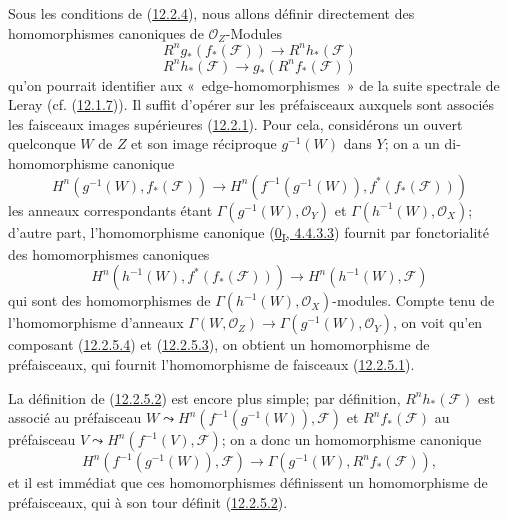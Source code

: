 \begin{env}[12.2.5]
\label{0.12.2.5-fr}
Sous les conditions de (\hyperref[0.12.2.4-fr]{12.2.4}), nous allons définir
directement des homomorphismes canoniques de $\mathcal O_Z$-Modules
\[
\label{0.12.2.5.1-fr}
\tag{12.2.5.1}
R^n g_*(f_*(\mathcal F))\longrightarrow R^n h_*(\mathcal F)
\]
\[
\label{0.12.2.5.2-fr}
\tag{12.2.5.2}
R^n h_*(\mathcal F)\longrightarrow g_*(R^n f_*(\mathcal F))
\]
qu'on pourrait identifier aux «~edge-homomorphismes~» de la suite spectrale
de Leray (cf. (\hyperref[0.12.1.7-fr]{12.1.7})). Il suffit d'opérer sur les
préfaisceaux auxquels sont associés les faisceaux images supérieures
(\hyperref[0.12.2.1-fr]{12.2.1}). Pour cela, considérons un ouvert quelconque
$W$ de $Z$ et son image réciproque $g^{-1}(W)$ dans $Y$; on a un
di-homomorphisme canonique
\[
\label{0.12.2.5.3-fr}
\tag{12.2.5.3}
H^n(g^{-1}(W),f_*(\mathcal F))\longrightarrow
H^n(f^{-1}(g^{-1}(W)),f^*(f_*(\mathcal F)))
\]
les anneaux correspondants étant $\Gamma(g^{-1}(W),\mathcal O_Y)$ et
$\Gamma(h^{-1}(W),\mathcal O_X)$; d'autre part, l'homomorphisme canonique
(\hyperref[0.4.4.3.3-fr]{0\textsubscript{I}, 4.4.3.3}) fournit par
fonctorialité des homomorphismes canoniques
\[
\label{0.12.2.5.4-fr}
\tag{12.2.5.4}
H^n(h^{-1}(W),f^*(f_*(\mathcal F)))\longrightarrow
H^n(h^{-1}(W),\mathcal F)
\]
qui sont des homomorphismes de $\Gamma(h^{-1}(W),\mathcal O_X)$-modules.
Compte tenu de l'homomorphisme d'anneaux
$\Gamma(W,\mathcal O_Z)\to\Gamma(g^{-1}(W),\mathcal O_Y)$, on voit qu'en
composant (\hyperref[0.12.2.5.4-fr]{12.2.5.4}) et
(\hyperref[0.12.2.5.3-fr]{12.2.5.3}), on obtient un homomorphisme de
préfaisceaux, qui fournit l'homomorphisme de faisceaux
(\hyperref[0.12.2.5.1-fr]{12.2.5.1}).

La définition de (\hyperref[0.12.2.5.2-fr]{12.2.5.2}) est encore plus
simple; par définition, $R^n h_*(\mathcal F)$ est associé au préfaisceau
$W\leadsto H^n(f^{-1}(g^{-1}(W)),\mathcal F)$ et $R^n f_*(\mathcal F)$ au
préfaisceau $V\leadsto H^n(f^{-1}(V),\mathcal F)$; on a donc un homomorphisme
canonique
\[
H^n(f^{-1}(g^{-1}(W)),\mathcal F)\longrightarrow
\Gamma(g^{-1}(W),R^n f_*(\mathcal F)),
\]
et il est immédiat que ces homomorphismes définissent un homomorphisme de
préfaisceaux, qui à son tour définit
(\hyperref[0.12.2.5.2-fr]{12.2.5.2}).
\end{env}

